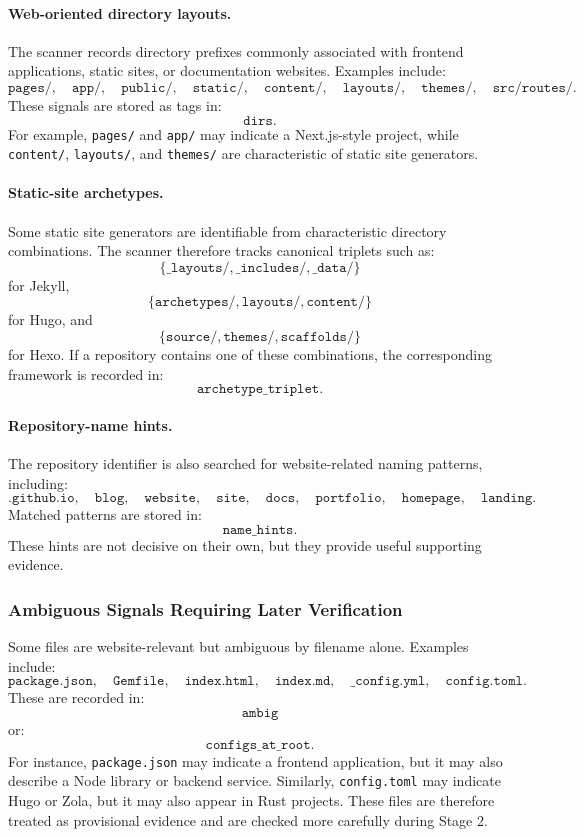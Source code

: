 \paragraph{Web-oriented directory layouts.}
The scanner records directory prefixes commonly associated with frontend applications, static sites, or documentation websites. Examples include:
\[
\texttt{pages/},\quad \texttt{app/},\quad \texttt{public/},\quad \texttt{static/},\quad
\texttt{content/},\quad \texttt{layouts/},\quad \texttt{themes/},\quad
\texttt{src/routes/}.
\]
These signals are stored as tags in:
\[
\texttt{dirs}.
\]
For example, \texttt{pages/} and \texttt{app/} may indicate a Next.js-style project, while \texttt{content/}, \texttt{layouts/}, and \texttt{themes/} are characteristic of static site generators.

\paragraph{Static-site archetypes.}
Some static site generators are identifiable from characteristic directory combinations. The scanner therefore tracks canonical triplets such as:
\[
\{\texttt{\_layouts/}, \texttt{\_includes/}, \texttt{\_data/}\}
\]
for Jekyll,
\[
\{\texttt{archetypes/}, \texttt{layouts/}, \texttt{content/}\}
\]
for Hugo, and
\[
\{\texttt{source/}, \texttt{themes/}, \texttt{scaffolds/}\}
\]
for Hexo. If a repository contains one of these combinations, the corresponding framework is recorded in:
\[
\texttt{archetype\_triplet}.
\]

\paragraph{Repository-name hints.}
The repository identifier is also searched for website-related naming patterns, including:
\[
\texttt{.github.io},\quad \texttt{blog},\quad \texttt{website},\quad \texttt{site},\quad
\texttt{docs},\quad \texttt{portfolio},\quad \texttt{homepage},\quad \texttt{landing}.
\]
Matched patterns are stored in:
\[
\texttt{name\_hints}.
\]
These hints are not decisive on their own, but they provide useful supporting evidence.

\subsubsection{Ambiguous Signals Requiring Later Verification}

Some files are website-relevant but ambiguous by filename alone. Examples include:
\[
\texttt{package.json},\quad \texttt{Gemfile},\quad \texttt{index.html},\quad
\texttt{index.md},\quad \texttt{\_config.yml},\quad \texttt{config.toml}.
\]
These are recorded in:
\[
\texttt{ambig}
\]
or:
\[
\texttt{configs\_at\_root}.
\]
For instance, \texttt{package.json} may indicate a frontend application, but it may also describe a Node library or backend service. Similarly, \texttt{config.toml} may indicate Hugo or Zola, but it may also appear in Rust projects. These files are therefore treated as provisional evidence and are checked more carefully during Stage 2.

